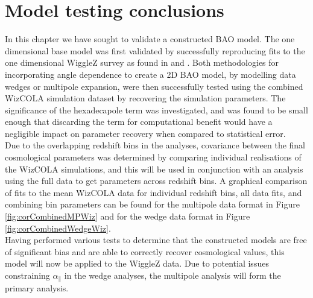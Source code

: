 \documentclass[titlesmallcaps, examinerscopy, copyrightpage]{uqthesis}
\begin{document}
\clearpage
\section{Model testing conclusions}

In this chapter we have sought to validate a constructed BAO model. The one dimensional base model was first validated by successfully reproducing fits to the one dimensional WiggleZ survey as found in \citet{BlakeDavis2011} and \citet{BlakeKazin2011}. Both methodologies for incorporating angle dependence to create a 2D BAO model, by modelling data wedges or multipole expansion, were then successfully tested using the combined WizCOLA simulation dataset by recovering the simulation parameters. The significance of the hexadecapole term was investigated, and was found to be small enough that discarding the term for computational benefit would have a negligible impact on parameter recovery when compared to statistical error.\\

Due to the overlapping redshift bins in the analyses, covariance between the final cosmological parameters was determined by comparing individual realisations of the WizCOLA simulations, and this will be used in conjunction with an analysis using the full data to get parameters across redshift bins. A graphical comparison of fits to the mean WizCOLA data for individual redshift bins, all data fits, and combining bin parameters can be found for the multipole data format in Figure \ref{fig:corCombinedMPWiz} and for the wedge data format in Figure \ref{fig:corCombinedWedgeWiz}. \\


Having performed various tests to determine that the constructed models are free of significant bias and are able to correctly recover cosmological values, this model will now be applied to the WiggleZ data. Due to potential issues constraining $\alpha_\parallel$ in the wedge analyses, the multipole analysis will form the primary analysis.
\end{document}
